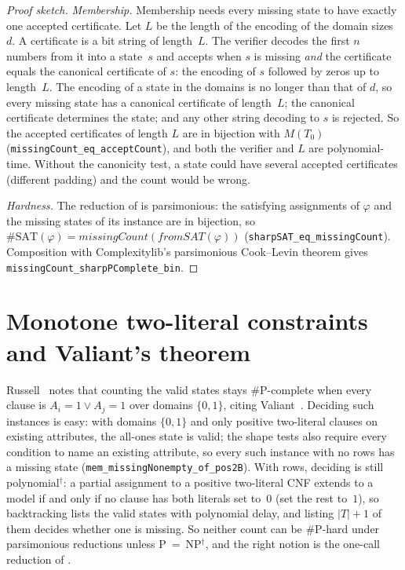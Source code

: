 \documentclass[pdflatex,sn-mathphys-num]{sn-jnl}
\theoremstyle{thmstyleone}
\theoremstyle{thmstylethree}
\newcommand{\informal}{\ensuremath{^{\dagger}}}
\begin{document}
\begin{proof}[Proof sketch]
\emph{Membership.} Membership needs every missing state to have exactly one accepted
certificate. Let $L$ be the length of the encoding of the domain sizes~$d$. A certificate is a
bit string of length~$L$. The verifier decodes the first $n$ numbers from it into a state~$s$
and accepts when $s$ is missing \emph{and} the certificate equals the canonical certificate of
$s$: the encoding of $s$ followed by zeros up to length~$L$. The encoding of a state in the
domains is no longer than that of $d$, so every missing state has a canonical certificate of
length~$L$; the canonical certificate determines the state; and any other string decoding to $s$
is rejected. So the accepted certificates of length $L$ are in bijection with $M(T_0)$
(\lstinline{missingCount_eq_acceptCount}), and both the verifier and $L$ are polynomial-time.
Without the canonicity test, a state could have several accepted certificates (different
padding) and the count would be wrong.

\emph{Hardness.} The reduction of  is parsimonious: the satisfying
assignments of $\varphi$ and the missing states of its instance are in bijection, so
$\#\mathrm{SAT}(\varphi) = \textit{missingCount}(\mathit{fromSAT}(\varphi))$
(\lstinline{sharpSAT_eq_missingCount}). Composition with Complexitylib's parsimonious
Cook--Levin theorem gives \lstinline{missingCount_sharpPComplete_bin}.
\end{proof}

\section{Monotone two-literal constraints and Valiant's theorem}
\label{sec:monotone}

Russell~\cite{PaperA} notes that counting the valid states stays \#P-complete when every
clause is $A_i = 1 \lor A_j = 1$ over domains $\{0,1\}$, citing
Valiant~\cite{Valiant1979enumeration}. Deciding such instances is easy: with domains
$\{0,1\}$ and only positive two-literal clauses on existing attributes, the all-ones state is
valid; the shape tests also require every condition to name an existing attribute, so every
such instance with no rows has a missing state (\lstinline{mem_missingNonempty_of_pos2B}). With
rows, deciding is still polynomial\informal: a partial assignment to a positive two-literal CNF
extends to a model if and only if no clause has both literals set to~$0$ (set the rest to~$1$),
so backtracking lists the valid states with polynomial delay, and listing $|T|+1$ of them
decides whether one is missing. So neither count can be \#P-hard under parsimonious reductions
unless P~=~NP\informal, and the right notion is the one-call reduction of .
\end{document}
